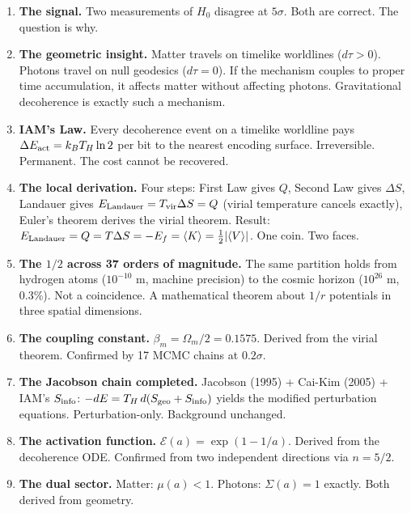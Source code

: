 \documentclass[12pt,a4paper]{article}
\begin{document}
\begin{enumerate}[leftmargin=1.5em,itemsep=0.3em]
\item \textbf{The signal.} Two measurements of $H_0$ disagree at $5\sigma$.
Both are correct. The question is why.

\item \textbf{The geometric insight.} Matter travels on timelike worldlines
($d\tau > 0$). Photons travel on null geodesics ($d\tau = 0$). If the mechanism
couples to proper time accumulation, it affects matter without affecting photons.
Gravitational decoherence is exactly such a mechanism.

\item \textbf{IAM's Law.} Every decoherence event on a timelike worldline pays
$\Delta E_{\rm act} = k_B T_H \ln 2$ per bit to the nearest encoding surface.
Irreversible. Permanent. The cost cannot be recovered.

\item \textbf{The local derivation.} Four steps: First Law gives $Q$, Second Law
gives $\Delta S$, Landauer gives $E_{\rm Landauer} = T_{\rm vir}\Delta S = Q$
(virial temperature cancels exactly), Euler's theorem derives the virial theorem.
Result: $E_{\rm Landauer} = Q = T\Delta S = -E_f = \langle K \rangle =
\frac{1}{2}|\langle V \rangle|$. One coin. Two faces.

\item \textbf{The $1/2$ across 37 orders of magnitude.} The same partition holds
from hydrogen atoms ($10^{-10}$ m, machine precision) to the cosmic horizon
($10^{26}$ m, 0.3\%). Not a coincidence. A mathematical theorem about $1/r$
potentials in three spatial dimensions.

\item \textbf{The coupling constant.} $\beta_m = \Omega_m/2 = 0.1575$. Derived
from the virial theorem. Confirmed by 17 MCMC chains at $0.2\sigma$.

\item \textbf{The Jacobson chain completed.} Jacobson (1995) + Cai-Kim (2005) +
IAM's $S_{\rm info}$: $-dE = T_H\,d(S_{\rm geo} + S_{\rm info})$ yields the
modified perturbation equations. Perturbation-only. Background unchanged.

\item \textbf{The activation function.} $\mathcal{E}(a) = \exp(1 - 1/a)$.
Derived from the decoherence ODE. Confirmed from two independent directions
via $n = 5/2$.

\item \textbf{The dual sector.} Matter: $\mu(a) < 1$. Photons: $\Sigma(a) = 1$
exactly. Both derived from geometry.


\end{enumerate}
\end{document}

